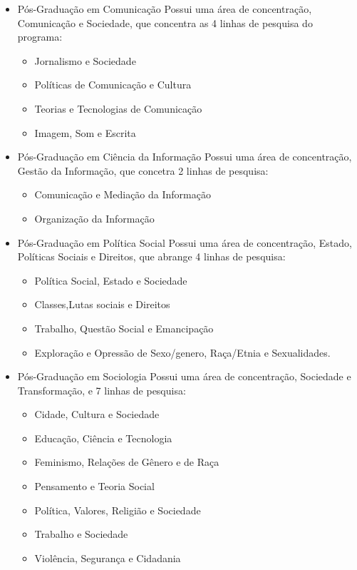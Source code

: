 \documentclass[]{article}
\providecommand{\tightlist}{%
  \setlength{\itemsep}{0pt}\setlength{\parskip}{0pt}}
\begin{document}
\begin{itemize}
\tightlist
\item
  Pós-Graduação em Comunicação Possui uma área de concentração,
  Comunicação e Sociedade, que concentra as 4 linhas de pesquisa do
  programa:

  \begin{itemize}
  \tightlist
  \item
    Jornalismo e Sociedade
  \item
    Políticas de Comunicação e Cultura
  \item
    Teorias e Tecnologias de Comunicação
  \item
    Imagem, Som e Escrita
  \end{itemize}
\item
  Pós-Graduação em Ciência da Informação Possui uma área de
  concentração, Gestão da Informação, que concetra 2 linhas de pesquisa:

  \begin{itemize}
  \tightlist
  \item
    Comunicação e Mediação da Informação
  \item
    Organização da Informação
  \end{itemize}
\item
  Pós-Graduação em Política Social Possui uma área de concentração,
  Estado, Políticas Sociais e Direitos, que abrange 4 linhas de
  pesquisa:

  \begin{itemize}
  \tightlist
  \item
    Política Social, Estado e Sociedade
  \item
    Classes,Lutas sociais e Direitos
  \item
    Trabalho, Questão Social e Emancipação
  \item
    Exploração e Opressão de Sexo/genero, Raça/Etnia e Sexualidades.
  \end{itemize}
\item
  Pós-Graduação em Sociologia Possui uma área de concentração, Sociedade
  e Transformação, e 7 linhas de pesquisa:

  \begin{itemize}
  \tightlist
  \item
    Cidade, Cultura e Sociedade
  \item
    Educação, Ciência e Tecnologia
  \item
    Feminismo, Relações de Gênero e de Raça
  \item
    Pensamento e Teoria Social
  \item
    Política, Valores, Religião e Sociedade
  \item
    Trabalho e Sociedade
  \item
    Violência, Segurança e Cidadania
  \end{itemize}
\end{itemize}
\end{document}
